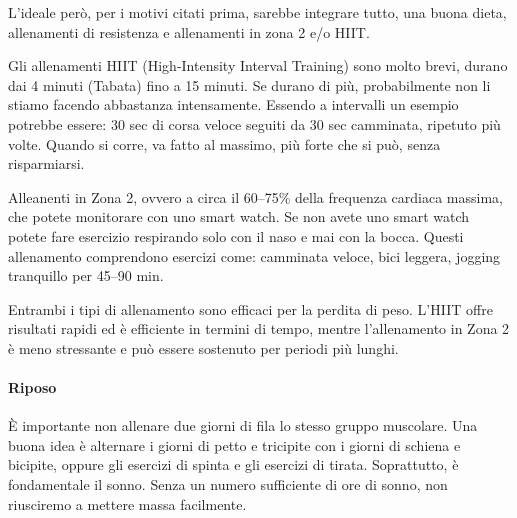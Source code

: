 \documentclass[12pt]{book} %
\begin{document}
L'ideale però, per i motivi citati prima, sarebbe integrare tutto, una buona dieta, allenamenti di resistenza e allenamenti in zona 2 e/o HIIT.

Gli allenamenti HIIT (High-Intensity Interval Training) sono molto brevi, durano dai 4 minuti (Tabata) fino a 15 minuti. Se durano di più, probabilmente non li stiamo facendo abbastanza intensamente.
Essendo a intervalli un esempio potrebbe essere: 30 sec di corsa veloce seguiti da 30 sec camminata, ripetuto più volte. Quando si corre, va fatto al massimo, più forte che si può, senza risparmiarsi.

Alleanenti in Zona 2, ovvero a circa il 60–75\% della frequenza cardiaca massima, che potete monitorare con uno smart watch. Se non avete uno smart watch potete fare esercizio respirando solo con il naso e mai con la bocca. Questi allenamento comprendono esercizi come: camminata veloce, bici leggera, jogging tranquillo per 45–90 min.

Entrambi i tipi di allenamento sono efficaci per la perdita di peso. L'HIIT offre risultati rapidi ed è efficiente in termini di tempo, mentre l'allenamento in Zona 2 è meno stressante e può essere sostenuto per periodi più lunghi.

\paragraph{Riposo}
È importante non allenare due giorni di fila lo stesso gruppo muscolare. Una buona idea è alternare i giorni di petto e tricipite con i giorni di schiena e bicipite, oppure gli esercizi di spinta e gli esercizi di tirata.
Soprattutto, è fondamentale il sonno. Senza un numero sufficiente di ore di sonno, non riusciremo a mettere massa facilmente.
\end{document}
